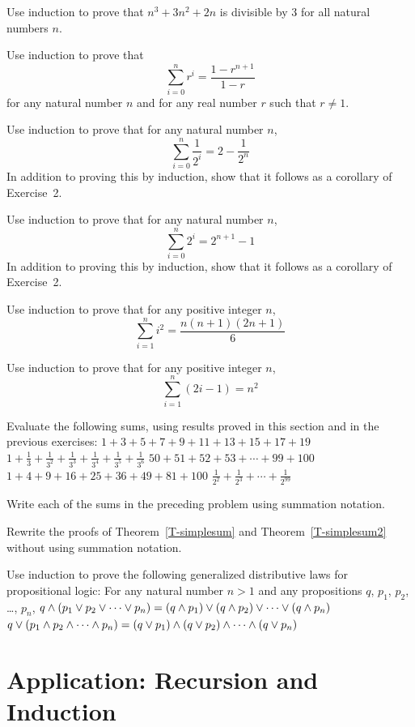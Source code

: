 \begin{exercises}

\problem Use induction to prove that $n^3 + 3n^2 + 2n$ is divisible by 3
for all natural numbers $n$.

\problem Use induction to prove that
\[\sum_{i=0}^{n}r^i=\frac{1-r^{n+1}}{1-r}\]
for any natural number $n$ and for any real number $r$ such that $r\not=1$.

\problem Use induction to prove that for any natural number $n$,
\[\sum_{i=0}^{n}\frac{1}{2^i}=2-\frac{1}{2^{n}}\]
In addition to proving this by induction, show that it follows
as a corollary of Exercise~2.

\problem Use induction to prove that for any natural number $n$,
\[\sum_{i=0}^{n}2^i=2^{n+1}-1\]
In addition to proving this by induction, show that it follows
as a corollary of Exercise~2.

\problem Use induction to prove that for any positive integer $n$,
\[\sum_{i=1}^ni^2=\frac{n(n+1)(2n+1)}{6}\]

\problem Use induction to prove that for any positive integer $n$,
\[\sum_{i=1}^n(2i-1)=n^2\]

\problem Evaluate the following sums, using results proved in this
section and in the previous exercises:
\ppart $1+3+5+7+9+11+13+15+17+19$
\ppart $\displaystyle 1+\frac{1}{3}+\frac{1}{3^2}+\frac{1}{3^3}+\frac{1}{3^4}+\frac{1}{3^5}+\frac{1}{3^6}$
\ppart $50+51+52+53+\cdots+99+100$
\ppart $1+4+9+16+25+36+49+81+100$
\ppart $\displaystyle \frac{1}{2^2}+\frac{1}{2^3}+\cdots+\frac{1}{2^{99}}$

\problem Write each of the sums in the preceding problem using
summation notation.

\problem Rewrite the proofs of Theorem~\ref{T-simplesum} and
Theorem~\ref{T-simplesum2} without using summation notation.

\problem Use induction to prove the following generalized distributive
laws for propositional logic:  For any natural number $n>1$ and any
propositions $q$, $p_1$, $p_2$, \dots, $p_n$,
\ppart $q\wedge(p_1\vee p_2\vee\cdots\vee p_n)=(q\wedge p_1)\vee(q\wedge p_2)\vee\cdots\vee(q\wedge p_n)$
\ppart $q\vee(p_1\wedge p_2\wedge\cdots\wedge p_n)=(q\vee p_1)\wedge(q\vee p_2)\wedge\cdots\wedge(q\vee p_n)$


\end{exercises}


\section{Application: Recursion and Induction}


